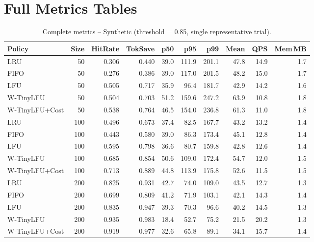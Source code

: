 \documentclass[11pt,a4paper]{article}
\begin{document}
\section{Full Metrics Tables}

\begin{table}[H]
\centering
\caption{Complete metrics -- Synthetic (threshold = 0.85, single representative trial).}
\label{tab:full_synthetic}
\scriptsize
\setlength{\tabcolsep}{3pt}
\begin{tabular}{@{} l r rrrr rr rr @{}}
\toprule
\textbf{Policy} & \textbf{Size} & \textbf{HitRate} & \textbf{TokSave} & \textbf{p50} & \textbf{p95} & \textbf{p99} & \textbf{Mean} & \textbf{QPS} & \textbf{Mem\,MB} \\
\midrule
LRU              & 50  & 0.306 & 0.440 & 39.0 & 111.9 & 201.1 & 47.8 & 14.9 & 1.7 \\
FIFO             & 50  & 0.276 & 0.386 & 39.0 & 117.0 & 201.5 & 48.2 & 15.0 & 1.7 \\
LFU              & 50  & 0.505 & 0.717 & 35.9 & 96.4  & 181.7 & 42.9 & 14.2 & 1.6 \\
W-TinyLFU        & 50  & 0.504 & 0.703 & 51.2 & 159.6 & 247.2 & 63.9 & 10.8 & 1.8 \\
W-TinyLFU+Cost   & 50  & 0.538 & 0.764 & 46.5 & 154.0 & 236.8 & 61.3 & 11.0 & 1.8 \\
\midrule
LRU              & 100 & 0.496 & 0.673 & 37.4 & 82.5  & 167.7 & 43.2 & 13.2 & 1.4 \\
FIFO             & 100 & 0.443 & 0.580 & 39.0 & 86.3  & 173.4 & 45.1 & 12.8 & 1.4 \\
LFU              & 100 & 0.595 & 0.798 & 36.6 & 80.7  & 159.8 & 42.8 & 12.6 & 1.4 \\
W-TinyLFU        & 100 & 0.685 & 0.854 & 50.6 & 109.0 & 172.4 & 54.7 & 12.0 & 1.5 \\
W-TinyLFU+Cost   & 100 & 0.713 & 0.889 & 44.8 & 113.9 & 175.8 & 52.6 & 11.5 & 1.5 \\
\midrule
LRU              & 200 & 0.825 & 0.931 & 42.7 & 74.0  & 109.0 & 43.5 & 12.7 & 1.3 \\
FIFO             & 200 & 0.699 & 0.809 & 41.2 & 71.9  & 103.1 & 42.1 & 14.3 & 1.4 \\
LFU              & 200 & 0.835 & 0.947 & 39.3 & 70.3  & 96.6  & 40.2 & 14.5 & 1.3 \\
W-TinyLFU        & 200 & 0.935 & 0.983 & 18.4 & 52.7  & 75.2  & 21.5 & 20.2 & 1.3 \\
W-TinyLFU+Cost   & 200 & 0.919 & 0.977 & 32.6 & 65.8  & 89.1  & 34.1 & 15.7 & 1.4 \\
\bottomrule
\end{tabular}
\end{table}
\end{document}
